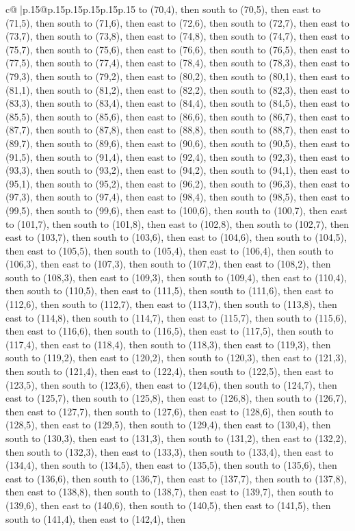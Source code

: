 \documentclass{article}
\begin{document}
{\begin{supertabular}{c@{$\;$}|p{.15\linewidth}@{}p{.15\linewidth}p{.15\linewidth}p{.15\linewidth}p{.15\linewidth}p{.15\linewidth}}
{{{to (70,4), then south to (70,5), then east to (71,5), then south to (71,6), then east to (72,6), then south to (72,7), then east to (73,7), then south to (73,8), then east to (74,8), then south to (74,7), then east to (75,7), then south to (75,6), then east to (76,6), then south to (76,5), then east to (77,5), then south to (77,4), then east to (78,4), then south to (78,3), then east to (79,3), then south to (79,2), then east to (80,2), then south to (80,1), then east to (81,1), then south to (81,2), then east to (82,2), then south to (82,3), then east to (83,3), then south to (83,4), then east to (84,4), then south to (84,5), then east to (85,5), then south to (85,6), then east to (86,6), then south to (86,7), then east to (87,7), then south to (87,8), then east to (88,8), then south to (88,7), then east to (89,7), then south to (89,6), then east to (90,6), then south to (90,5), then east to (91,5), then south to (91,4), then east to (92,4), then south to (92,3), then east to (93,3), then south to (93,2), then east to (94,2), then south to (94,1), then east to (95,1), then south to (95,2), then east to (96,2), then south to (96,3), then east to (97,3), then south to (97,4), then east to (98,4), then south to (98,5), then east to (99,5), then south to (99,6), then east to (100,6), then south to (100,7), then east to (101,7), then south to (101,8), then east to (102,8), then south to (102,7), then east to (103,7), then south to (103,6), then east to (104,6), then south to (104,5), then east to (105,5), then south to (105,4), then east to (106,4), then south to (106,3), then east to (107,3), then south to (107,2), then east to (108,2), then south to (108,3), then east to (109,3), then south to (109,4), then east to (110,4), then south to (110,5), then east to (111,5), then south to (111,6), then east to (112,6), then south to (112,7), then east to (113,7), then south to (113,8), then east to (114,8), then south to (114,7), then east to (115,7), then south to (115,6), then east to (116,6), then south to (116,5), then east to (117,5), then south to (117,4), then east to (118,4), then south to (118,3), then east to (119,3), then south to (119,2), then east to (120,2), then south to (120,3), then east to (121,3), then south to (121,4), then east to (122,4), then south to (122,5), then east to (123,5), then south to (123,6), then east to (124,6), then south to (124,7), then east to (125,7), then south to (125,8), then east to (126,8), then south to (126,7), then east to (127,7), then south to (127,6), then east to (128,6), then south to (128,5), then east to (129,5), then south to (129,4), then east to (130,4), then south to (130,3), then east to (131,3), then south to (131,2), then east to (132,2), then south to (132,3), then east to (133,3), then south to (133,4), then east to (134,4), then south to (134,5), then east to (135,5), then south to (135,6), then east to (136,6), then south to (136,7), then east to (137,7), then south to (137,8), then east to (138,8), then south to (138,7), then east to (139,7), then south to (139,6), then east to (140,6), then south to (140,5), then east to (141,5), then south to (141,4), then east to (142,4), then }}}
\end{supertabular}}
\end{document}
